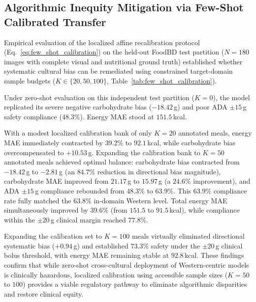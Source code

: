 \documentclass[utf8]{FrontiersinVancouver}
\begin{document}
\subsection{Algorithmic Inequity Mitigation via Few-Shot Calibrated Transfer}

Empirical evaluation of the localized affine recalibration protocol (Eq.~\ref{eq:few_shot_calibration}) on the held-out FoodBD test partition ($N=180$ images with complete visual and nutritional ground truth) established whether systematic cultural bias can be remediated using constrained target-domain sample budgets ($K \in \{20, 50, 100\}$, Table~\ref{tab:few_shot_calibration}).

Under zero-shot evaluation on this independent test partition ($K=0$), the model replicated its severe negative carbohydrate bias ($-18.42$\,g) and poor ADA $\pm 15$\,g safety compliance ($48.3\%$). Energy MAE stood at $151.5$\,kcal.

With a modest localized calibration bank of only $K=20$ annotated meals, energy MAE immediately contracted by $39.2\%$ to $92.1$\,kcal, while carbohydrate bias overcompensated to $+10.53$\,g. Expanding the calibration bank to $K=50$ annotated meals achieved optimal balance: carbohydrate bias contracted from $-18.42$\,g to $-2.81$\,g (an $84.7\%$ reduction in directional bias magnitude), carbohydrate MAE improved from $21.17$\,g to $15.97$\,g (a $24.6\%$ improvement), and ADA $\pm 15$\,g compliance rebounded from $48.3\%$ to $63.9\%$. This $63.9\%$ compliance rate fully matched the $63.8\%$ in-domain Western level. Total energy MAE simultaneously improved by $39.6\%$ (from $151.5$ to $91.5$\,kcal), while compliance within the $\pm 20$\,g clinical margin reached $77.8\%$.

Expanding the calibration set to $K=100$ meals virtually eliminated directional systematic bias ($+0.94$\,g) and established $73.3\%$ safety under the $\pm 20$\,g clinical bolus threshold, with energy MAE remaining stable at $92.8$\,kcal. These findings confirm that while zero-shot cross-cultural deployment of Western-centric models is clinically hazardous, localized calibration using accessible sample sizes ($K=50$ to $100$) provides a viable regulatory pathway to eliminate algorithmic disparities and restore clinical equity.
\end{document}
